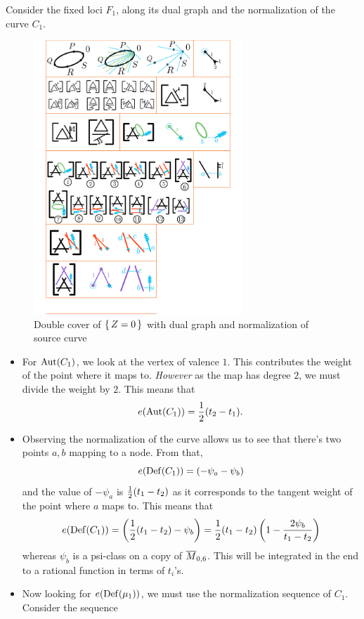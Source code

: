\documentclass[12pt]{memoir}
\begin{document}
\begin{Ex}
    Consider the fixed loci $F_1$, along its dual graph and the normalization of the curve $C_1$.
    \begin{figure}[h!]
        \centering
        \includegraphics[width=0.7\textwidth, trim= 9cm 17cm 1.3cm 8cm,clip]{../figs/FigsDNnotability3.pdf}
        \caption{Double cover of $\{\,Z=0\,\}$ with dual graph and normalization of source curve}
        \label{fig:double-cover-F1-5marks}
    \end{figure}
    \begin{itemize}
        \item For $\operatorname{Aut}(C_1)$, we look at the vertex of valence $1$. This contributes the weight of the point where it maps to. \emph{However} as the map has degree $2$, we must divide the weight by $2$. This means that 
        $$e(\Aut(C_1))=\half(t_2-t_1).$$
        \item Observing the normalization of the curve allows us to see that there's two points $a,b$ mapping to a node. From that, 
        $$e(\operatorname{Def}(C_1))=(-\psi_a-\psi_b)$$
        and the value of $-\psi_a$ is $\half(t_1-t_2)$ as it corresponds to the tangent weight of the point where $a$ maps to. This means that 
        $$e(\DefB(C_1))=\left(\half(t_1-t_2)-\psi_b\right)=\half(t_1-t_2)\left(1-\frac{2\psi_b}{t_1-t_2}\right)$$
        whereas $\psi_b$ is a psi-class on a copy of $\overline{M}_{0,6}$. This will be integrated in the end to a rational function in terms of $t_i$'s.
        \item Now looking for $e(\operatorname{Def}(\mu_1))$, we must use the normalization sequence of $C_1$. Consider the sequence 

\end{itemize}
\end{Ex}
\end{document}
